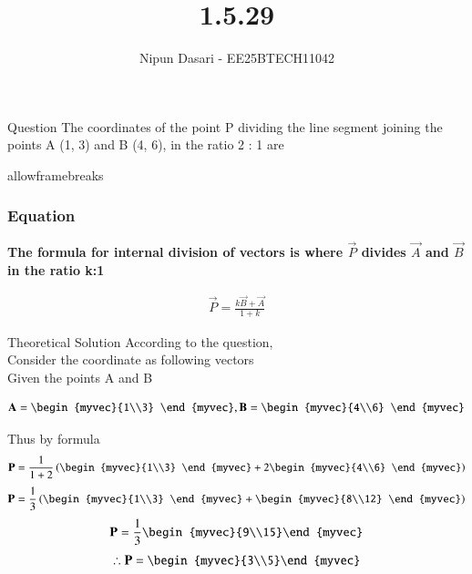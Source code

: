 \documentclass{beamer}
\title %
{1.5.29}
\author %
{Nipun Dasari - EE25BTECH11042}
\begin{document}
	
	
	\frame{\titlepage}
	\begin{frame}{Question}
		The coordinates of the point P dividing the line segment joining the points A (1, 3)
		and B (4, 6), in the ratio 2 : 1 are
	\end{frame}
	\begin{frame}{allowframebreaks}
		\frametitle{Equation}
	\textbf{The formula for internal division of vectors is where $\vec{P}$ divides $\vec{A}$ and $\vec{B}$ in the ratio k:1}
		\centering
		
		\label{tab:parameters}
		\begin{align*}

		
			\vec{P} =	\frac{k\vec{B} + \vec{A}}{1+k} 
		
		\end{align*}
		
	\end{frame}
	
	
	\begin{frame}{Theoretical Solution}
	According to the question, \\
Consider the coordinate as following vectors \\ 

Given the points A and B

\begin{align*}
	\vec{A} = \begin{myvec}{1\\3} \end{myvec} , \vec{B} = \begin{myvec}{4\\6} \end{myvec}
\end{align*}

Thus by formula
\begin{align*}
	\vec{P} = \frac{1}{1+2}\brak{\begin{myvec}{1\\3} \end{myvec}+2\begin{myvec}{4\\6} \end{myvec}}
\end{align*}
\begin{align*}
	\vec{P} = \frac{1}{3}\brak{\begin{myvec}{1\\3} \end{myvec}+\begin{myvec}{8\\12} \end{myvec}}
\end{align*}
\begin{align*}
	\vec{P} = \frac{1}{3}\begin{myvec}{9\\15}\end{myvec}
\end{align*}
\begin{align*}
	\therefore	\vec{P} = \begin{myvec}{3\\5}\end{myvec}
\end{align*}
\end{frame}
	
\end{document}
